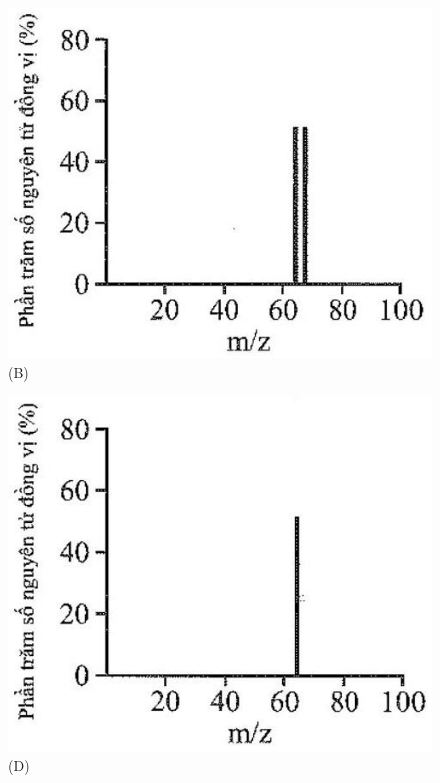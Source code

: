 \documentclass[10pt]{article}
\begin{document}
\begin{figure}[h]
\begin{center}
  \includegraphics[width=\textwidth]{2025_10_23_76620c17ffac1ae9b35bg-07(1)}
\captionsetup{labelformat=empty}
\caption{(B)}
\end{center}
\end{figure}

\begin{figure}[h]
\begin{center}
  \includegraphics[width=\textwidth]{2025_10_23_76620c17ffac1ae9b35bg-07(3)}
\captionsetup{labelformat=empty}
\caption{(D)}
\end{center}
\end{figure}
\end{document}
